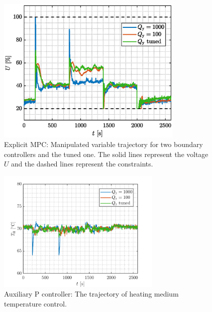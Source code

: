 \documentclass[preprint,12pt]{elsarticle}
\begin{document}
\begin{figure}
	\begin{center}
		\includegraphics[width=0.8\textwidth]{images/MV}
		\caption{Explicit MPC: Manipulated variable trajectory for two boundary controllers and the tuned one. The solid lines represent the voltage $U$ and the dashed lines represent the constraints.}
		\label{fig:MV}
	\end{center}
\end{figure}

\begin{figure}
	\begin{center}
		\includegraphics[width=0.7\textwidth]{images/Th}
		\caption{Auxiliary P controller: The trajectory of heating medium temperature control.}
		\label{fig:Th}
	\end{center}
\end{figure}
\end{document}

